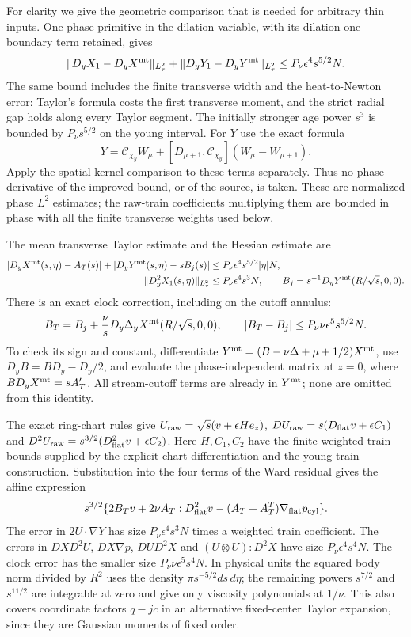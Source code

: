 For clarity we give the geometric comparison that is needed for
arbitrary thin inputs. One phase primitive in the dilation variable,
with its dilation-one boundary term retained, gives
\[
 \|D_yX_1-D_yX^{\rm mt}\|_{L^2_\tau}
 +\|D_yY_1-D_yY^{\rm mt}\|_{L^2_\tau}
       \le P_\nu\epsilon^4s^{5/2}N.
\]
The same bound includes the finite transverse width and the
heat-to-Newton error: Taylor's formula costs the first transverse
moment, and the strict radial gap holds along every Taylor segment.
The initially stronger age power $s^3$ is bounded by
$P_\nu s^{5/2}$ on the young interval. For $Y$ use the exact formula
\[
 Y=\mathcal C_{\chi_y}W_\mu+
 [D_{\mu+1},\mathcal C_{\chi_y}](W_\mu-W_{\mu+1}).
\]
Apply the spatial kernel comparison to these terms separately.
Thus no phase derivative of the improved bound, or of the source,
is taken. These are normalized phase $L^2$ estimates; the raw-train
coefficients multiplying them are bounded in phase with all the
finite transverse weights used below.

The mean transverse Taylor estimate and the Hessian estimate are
\[
 \begin{split}
 |D_yX^{\rm mt}(s,\eta)-A_T(s)|
 +|D_yY^{\rm mt}(s,\eta)-sB_j(s)|
   &\le P_\nu\epsilon^4s^{5/2}|\eta|N,\\
 \|D_y^2X_1(s,\eta)\|_{L^2_\tau}
   &\le P_\nu\epsilon^4s^3N,
 \qquad B_j=s^{-1}D_yY^{\rm mt}(R/\sqrt s,0,0).
 \end{split}
\]
There is an exact clock correction, including on the cutoff annulus:
\begin{equation}\label{repair:exact-jet-clock}
 B_T=B_j+\frac\nu sD_y\Delta_yX^{\rm mt}(R/\sqrt s,0,0),
 \qquad |B_T-B_j|\le P_\nu\nu\epsilon^5s^{5/2}N.
\end{equation}
To check its sign and constant, differentiate
$Y^{\rm mt}=(B-\nu\Delta+\mu+1/2)X^{\rm mt}$, use
$D_yB=BD_y-D_y/2$, and evaluate the phase-independent matrix at
$z=0$, where $B D_yX^{\rm mt}=sA_T'$. All stream-cutoff terms
are already in $Y^{\rm mt}$; none are omitted from this identity.

The exact ring-chart rules give
$U_{\rm raw}=\sqrt s(v+\epsilon H e_z)$,
$DU_{\rm raw}=s(D_{\rm flat}v+\epsilon C_1)$ and
$D^2U_{\rm raw}=s^{3/2}(D_{\rm flat}^2v+\epsilon C_2)$.
Here $H,C_1,C_2$ have the finite weighted train bounds supplied by
the explicit chart differentiation and the young train construction.
Substitution into the four terms of the Ward residual gives the
affine expression
\[
 s^{3/2}\{2B_Tv+2\nu A_T:D_{\rm flat}^2v
                      -(A_T+A_T^T)\nabla_{\rm flat}p_{\rm cyl}\}.
\]
The error in $2U\cdot\nabla Y$ has size
$P_\nu\epsilon^4s^3N$ times a weighted train coefficient.
The errors in $DXD^2U$, $DX\nabla p$, $DUD^2X$ and
$(U\otimes U):D^2X$ have size
$P_\nu\epsilon^4s^4N$. The clock error has the smaller size
$P_\nu\nu\epsilon^5s^4N$. In physical units the squared body
norm divided by $R^2$ uses the density $\pi s^{-5/2}ds\,d\eta$;
the remaining powers $s^{7/2}$ and $s^{11/2}$ are integrable at
zero and give only viscosity polynomials at $1/\nu$. This also
covers coordinate factors $q-jc$ in an alternative fixed-center
Taylor expansion, since they are Gaussian moments of fixed order.

